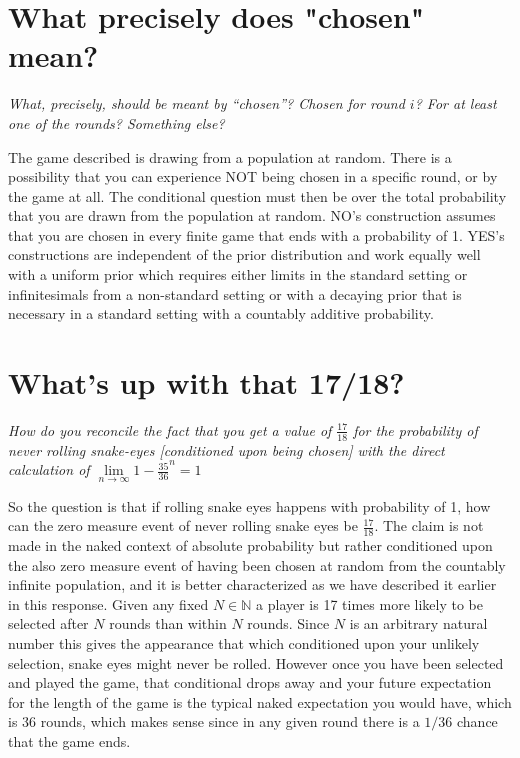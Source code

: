 \documentclass[article,twocolumn]{memoir}
\begin{document}
\chapter{What precisely does "chosen" mean?}

\emph{What, precisely, should be meant by “chosen”? 
Chosen for round $i$? 
For at least one of the rounds? 
Something else?}

\vspace{1em}

The game described is drawing from a population at random.
There is a possibility that you can experience NOT being chosen in a specific round, or by the game at all.
The conditional question must then be over the total probability that you are drawn from the population at random. 
NO's construction assumes that you are chosen in every finite game that ends with a probability of 1.
YES's constructions are independent of the prior distribution and work equally well with a uniform prior which requires either limits in the standard setting or infinitesimals from a non-standard setting or with a decaying prior that is necessary in a standard setting with a countably additive probability.

\chapter{What's up with that 17/18?}

\emph{How do you reconcile the fact that you get a value of $\frac{17}{18}$ for the probability of never rolling snake-eyes [conditioned upon being chosen] with the direct calculation of $\underset{n\to\infty}{\lim}1-\frac{35}{36}^n=1$}

\vspace{1em}

So the question is that if rolling snake eyes happens with probability of 1, how can the zero measure event of never rolling snake eyes be $\frac{17}{18}$.
The claim is not made in the naked context of absolute probability but rather conditioned upon the also zero measure event of having been chosen at random from the countably infinite population, and it is better characterized as we have described it earlier in this response.
Given any fixed $N\in\mathbb{N}$ a player is 17 times more likely to be selected after $N$ rounds than within $N$ rounds.
Since $N$ is an arbitrary natural number this gives the appearance that which conditioned upon your unlikely selection, snake eyes might never be rolled.
However once you have been selected and played the game, that conditional drops away and your future expectation for the length of the game is the typical naked expectation you would have, which is 36 rounds, which makes sense since in any given round there is a $1/36$ chance that the game ends.
\end{document}
